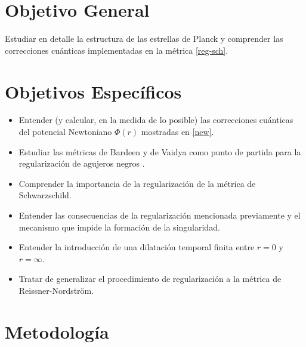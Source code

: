 \documentclass[prb,aps,preprintnumbers,amsmath,amssymb]{article}
\begin{document}
\section{Objetivo General}


Estudiar en detalle la estructura de las estrellas de Planck y comprender las correcciones cu\'anticas implementadas en la m\'etrica \eqref{reg-sch}.


\section{Objetivos Espec\'ificos}


\begin{itemize}
	\item Entender (y calcular, en la medida de lo posible) las correcciones cu\'anticas del potencial Newtoniano $\Phi (r)$ mostradas en \eqref{new}.
	\item Estudiar las m\'etricas de Bardeen y de Vaidya como punto de partida para la regularizaci\'on de agujeros negros \cite{vaidya}.
	\item Comprender la importancia de la regularizaci\'on de la m\'etrica de Schwarzschild.
	\item Entender las consecuencias de la regularizaci\'on mencionada previamente y el mecanismo que impide la formaci\'on de la singularidad.
	\item Entender la introducci\'on de una dilataci\'on temporal finita entre $r = 0$ y $r = \infty$.
	\item Tratar de generalizar el procedimiento de regularizaci\'on a la m\'etrica de Reissner-Nordstr\"om.
\end{itemize}

\section{Metodolog\'ia}



\end{document}
